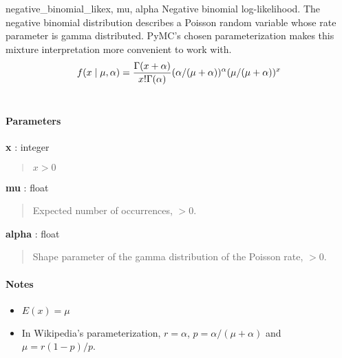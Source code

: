 \hypertarget{pymc.distributions.negative_binomial_like}{}
\begin{funcdesc}{negative\_binomial\_like}{x, mu, alpha}
Negative binomial log-likelihood. The negative binomial distribution describes a 
Poisson random variable whose rate parameter is gamma distributed. PyMC's chosen
parameterization makes this mixture interpretation more convenient to work with.
\begin{gather}
\begin{split}f(x \mid \mu, \alpha) = \frac{\Gamma(x+\alpha)}{x! \Gamma(\alpha)} (\alpha/(\mu+\alpha))^\alpha (\mu/(\mu+\alpha))^x\end{split}\notag\\\begin{split}\end{split}\notag
\end{gather}
\paragraph{Parameters}
\begin{paramlist}
\item[]\textbf{x} : integer
\begin{quote}
$x>0$
\end{quote}

\item[]\textbf{mu} : float
\begin{quote}
Expected number of occurrences, $>0$.
\end{quote}

\item[]\textbf{alpha} : float
\begin{quote}
Shape parameter of the gamma distribution of the Poisson rate, $>0$.
\end{quote}
\end{paramlist}

\paragraph{Notes}
\begin{itemize}
\item {} 
$E(x)=\mu$

\item {}
In Wikipedia's parameterization, $r=\alpha$, $p=\alpha/(\mu+\alpha)$ and $\mu=r(1-p)/p$.
\end{itemize}



\end{funcdesc}

